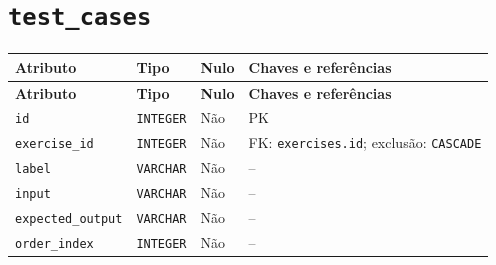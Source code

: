 \section*{\texttt{test\_\allowbreak{}cases}}
\begingroup\footnotesize
\setlength{\tabcolsep}{4pt}\renewcommand{\arraystretch}{1.15}
\begin{longtable}{|>{\raggedright\arraybackslash}p{}|>{\raggedright\arraybackslash}p{}|>{\raggedright\arraybackslash}p{}|>{\raggedright\arraybackslash}p{}|}
\hline
\textbf{Atributo} & \textbf{Tipo} & \textbf{Nulo} & \textbf{Chaves e referências} \\ \hline
\endfirsthead
\hline \textbf{Atributo} & \textbf{Tipo} & \textbf{Nulo} & \textbf{Chaves e referências} \\ \hline
\endhead
\texttt{id} & \texttt{INTEGER} & Não & PK \\ \hline
\texttt{exercise\_\allowbreak{}id} & \texttt{INTEGER} & Não & FK: \texttt{exercises.id}; exclusão: \texttt{CASCADE} \\ \hline
\texttt{label} & \texttt{VARCHAR} & Não & -- \\ \hline
\texttt{input} & \texttt{VARCHAR} & Não & -- \\ \hline
\texttt{expected\_\allowbreak{}output} & \texttt{VARCHAR} & Não & -- \\ \hline
\texttt{order\_\allowbreak{}index} & \texttt{INTEGER} & Não & -- \\ \hline
\end{longtable}
\endgroup

